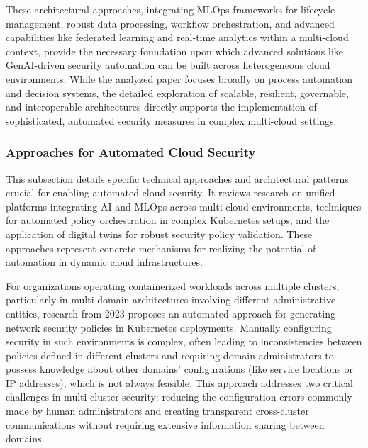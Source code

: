 These architectural approaches, integrating MLOps frameworks for lifecycle management, robust data processing, workflow orchestration, and advanced capabilities like federated learning and real-time analytics within a multi-cloud context, provide the necessary foundation upon which advanced solutions like GenAI-driven security automation can be built across heterogeneous cloud environments\cite{sushil_prabhu_prabhakaran_integration_2024}. While the analyzed paper focuses broadly on process automation and decision systems, the detailed exploration of scalable, resilient, governable, and interoperable architectures directly supports the implementation of sophisticated, automated security measures in complex multi-cloud settings\cite{sushil_prabhu_prabhakaran_integration_2024}.


\subsubsection{Approaches for Automated Cloud Security} %
\label{sec:Approaches for Automated Cloud Security}

This subsection details specific technical approaches and architectural patterns crucial for enabling automated cloud security. It reviews research on unified platforms integrating AI and MLOps across multi-cloud environments, techniques for automated policy orchestration in complex Kubernetes setups, and the application of digital twins for robust security policy validation. These approaches represent concrete mechanisms for realizing the potential of automation in dynamic cloud infrastructures.

For organizations operating containerized workloads across multiple clusters, particularly in multi-domain architectures involving different administrative entities, research from 2023 proposes an automated approach for generating network security policies in Kubernetes deployments\cite{bringhenti_security_2023}. Manually configuring security in such environments is complex, often leading to inconsistencies between policies defined in different clusters and requiring domain administrators to possess knowledge about other domains' configurations (like service locations or IP addresses), which is not always feasible\cite{bringhenti_security_2023}. This approach addresses two critical challenges in multi-cluster security: reducing the configuration errors commonly made by human administrators and creating transparent cross-cluster communications without requiring extensive information sharing between domains\cite{bringhenti_security_2023}.

